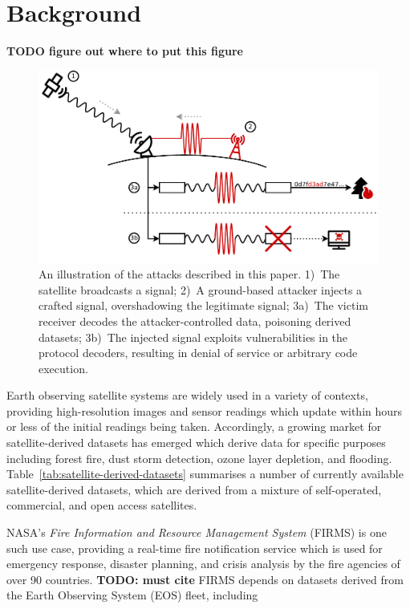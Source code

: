\section{Background}\label{sec:background}
\textbf{TODO figure out where to put this figure}

\begin{figure}
    \centering
    \includegraphics[width=\columnwidth]{diagrams/attack_illustration.pdf}
    \caption{An illustration of the attacks described in this paper. 1)~The satellite broadcasts a signal; 2)~A ground-based attacker injects a crafted signal, overshadowing the legitimate signal; 3a)~The victim receiver decodes the attacker-controlled data, poisoning derived datasets; 3b)~The injected signal exploits vulnerabilities in the protocol decoders, resulting in denial of service or arbitrary code execution.}
    \label{fig:attack-illustration}
\end{figure}

Earth observing satellite systems are widely used in a variety of contexts, providing high-resolution images and sensor readings which update within hours or less of the initial readings being taken.
Accordingly, a growing market for satellite-derived datasets has emerged which derive data for specific purposes including forest fire, dust storm detection, ozone layer depletion, and flooding.
Table~\ref{tab:satellite-derived-datasets} summarises a number of currently available satellite-derived datasets, which are derived from a mixture of self-operated, commercial, and open access satellites.

NASA's \textit{Fire Information and Resource Management System} (FIRMS) is one such use case, providing a real-time fire notification service which is used for emergency response, disaster planning, and crisis analysis by the fire agencies of over 90 countries. \textbf{TODO: must cite}
FIRMS depends on datasets derived from the Earth Observing System (EOS) fleet, including

